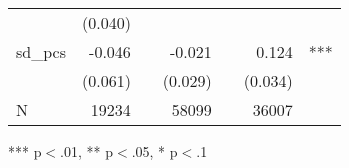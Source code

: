 \begin{table}[!h]
\begin{tabular}{lllllll}
  \multicolumn{1}{l}{} &
  \multicolumn{1}{r}{(0.040)} &
  \multicolumn{1}{l}{} \\
\multicolumn{1}{l}{sd\_pcs} &
  \multicolumn{1}{r}{-0.046} &
  \multicolumn{1}{l}{} &
  \multicolumn{1}{r}{-0.021} &
  \multicolumn{1}{l}{} &
  \multicolumn{1}{r}{0.124} &
  \multicolumn{1}{l}{***} \\
\multicolumn{1}{l}{} &
  \multicolumn{1}{r}{(0.061)} &
  \multicolumn{1}{l}{} &
  \multicolumn{1}{r}{(0.029)} &
  \multicolumn{1}{l}{} &
  \multicolumn{1}{r}{(0.034)} &
  \multicolumn{1}{l}{} \\
\multicolumn{1}{l}{N} &
  \multicolumn{1}{r}{19234} &
  \multicolumn{1}{l}{} &
  \multicolumn{1}{r}{58099} &
  \multicolumn{1}{l}{} &
  \multicolumn{1}{r}{36007} &
  \multicolumn{1}{l}{} \\
\cline{1-7}
\end{tabular}

\footnotesize{
*** p$<$.01, ** p$<$.05, * p$<$.1
}
\end{table}
